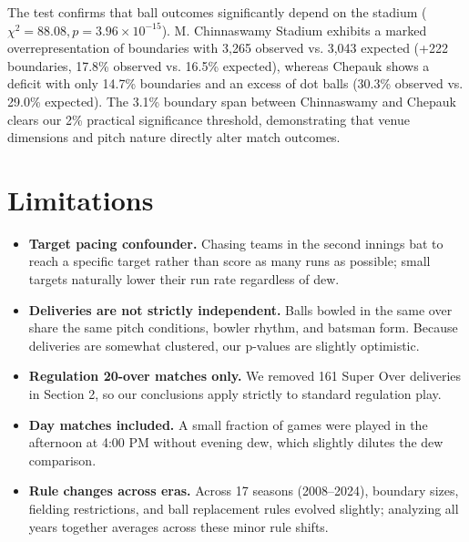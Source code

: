 \documentclass[10pt,a4paper,twocolumn]{article}
\newif\ifshowhints
\newcommand{\hint}[1]{\ifshowhints{\footnotesize\itshape\color{hintgrey}#1\par}\fi}
\newcommand{\egblock}[1]{{\color{eg}#1\par}}
\begin{document}
\egblock{The test confirms that ball outcomes significantly depend on the stadium ($\chi^2 = 88.08, p = 3.96 \times 10^{-15}$). M. Chinnaswamy Stadium exhibits a marked overrepresentation of boundaries with 3{,}265 observed vs. 3{,}043 expected (+222 boundaries, 17.8\% observed vs. 16.5\% expected), whereas Chepauk shows a deficit with only 14.7\% boundaries and an excess of dot balls (30.3\% observed vs. 29.0\% expected). The 3.1\% boundary span between Chinnaswamy and Chepauk clears our 2\% practical significance threshold, demonstrating that venue dimensions and pitch nature directly alter match outcomes.}

\section{Limitations}
\hint{What your analysis cannot show, and why: rows you dropped, assumptions that hold only
approximately, groups your conclusions do not cover, and association versus cause.}

\begin{itemize}
  \item \textbf{Target pacing confounder.} Chasing teams in the second innings bat to reach a specific target rather than score as many runs as possible; small targets naturally lower their run rate regardless of dew.
  \item \textbf{Deliveries are not strictly independent.} Balls bowled in the same over share the same pitch conditions, bowler rhythm, and batsman form. Because deliveries are somewhat clustered, our p-values are slightly optimistic.
  \item \textbf{Regulation 20-over matches only.} We removed 161 Super Over deliveries in Section 2, so our conclusions apply strictly to standard regulation play.
  \item \textbf{Day matches included.} A small fraction of games were played in the afternoon at 4:00 PM without evening dew, which slightly dilutes the dew comparison.
  \item \textbf{Rule changes across eras.} Across 17 seasons (2008--2024), boundary sizes, fielding restrictions, and ball replacement rules evolved slightly; analyzing all years together averages across these minor rule shifts.
\end{itemize}
\end{document}
